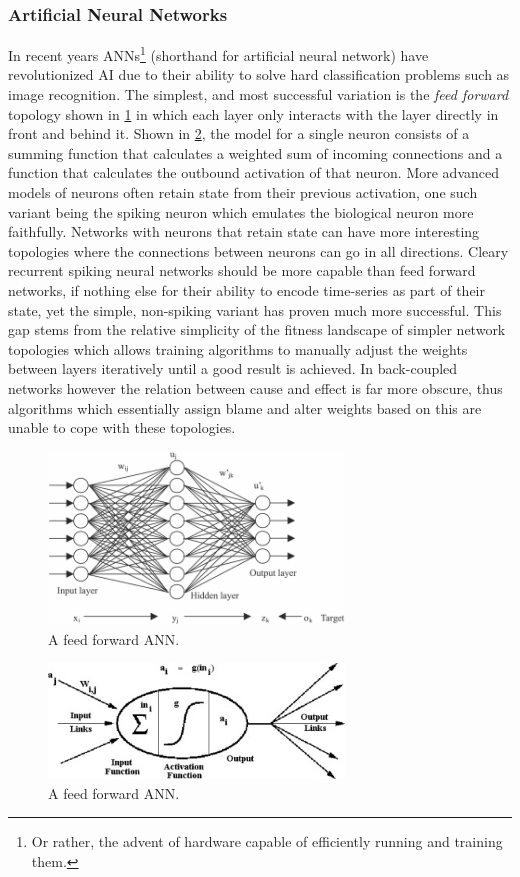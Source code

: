 \subsubsection{Artificial Neural Networks}
In recent years ANNs\footnote{Or rather, the advent of hardware capable of
  efficiently running and training them.} (shorthand for artificial neural
network) have revolutionized AI due to their ability to solve hard
classification problems such as image recognition.
The simplest, and most successful variation is the \emph{feed forward} topology
shown in \ref{figFFANN} in which each layer only interacts with the layer
directly in front and behind it.
Shown in \ref{figNeuronModel}, the model for a single neuron consists of a
summing function that calculates a weighted sum of incoming connections and a
function that calculates the outbound activation of that neuron.
More advanced models of neurons often retain state from their previous
activation, one such variant being the spiking neuron which emulates the
biological neuron more faithfully.
Networks with neurons that retain state can have more interesting topologies
where the connections between neurons can go in all directions.
Cleary recurrent spiking neural networks should be more capable than feed
forward networks, if nothing else for their ability to encode time-series as
part of their state, yet the simple, non-spiking variant has proven much more
successful.
This gap stems from the relative simplicity of the fitness landscape of simpler
network topologies which allows training algorithms to manually adjust the
weights between layers iteratively until a good result is achieved.
In back-coupled networks however the relation between cause and effect is far
more obscure, thus algorithms which essentially assign blame and alter weights
based on this are unable to cope with these topologies.
\begin{figure}[h!]
  \centering
  \includegraphics[width=0.7\textwidth]{fig/FFANN.png}
  \caption{A feed forward ANN.}
  \label{figFFANN}
\end{figure}
\begin{figure}[h!]
  \centering
  \includegraphics[width=0.7\textwidth]{fig/ArtificialNeuron.jpg}
  \caption{A feed forward ANN.}
  \label{figNeuronModel}
\end{figure}

